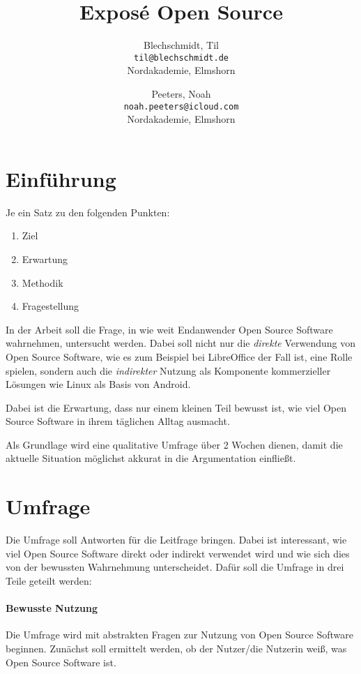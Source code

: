\documentclass[a4paper]{article}
\title{Exposé Open Source}
\author{
  Blechschmidt, Til\\
  \texttt{til@blechschmidt.de}\\
  Nordakademie, Elmshorn
  \and
  Peeters, Noah\\
  \texttt{noah.peeters@icloud.com}\\
  Nordakademie, Elmshorn
}
\begin{document}
	\maketitle
	
	\section{Einführung}
	   Je ein Satz zu den folgenden Punkten:
	   \begin{enumerate}
	       \item Ziel
	       \item Erwartung
	       \item Methodik
	       \item Fragestellung
	   \end{enumerate}
	
	   In der Arbeit soll die Frage, in wie weit Endanwender Open Source Software wahrnehmen, untersucht werden. Dabei soll nicht nur die \emph{direkte} Verwendung von Open Source Software, wie es zum Beispiel bei LibreOffice der Fall ist, eine Rolle spielen, sondern auch die \emph{indirekter} Nutzung als Komponente kommerzieller Lösungen wie Linux als Basis von Android.
	   
	   Dabei ist die Erwartung, dass nur einem kleinen Teil bewusst ist, wie viel Open Source Software in ihrem täglichen Alltag ausmacht.
	   
	   Als Grundlage wird eine qualitative Umfrage über 2 Wochen dienen, damit die aktuelle Situation möglichst akkurat in die Argumentation einfließt.
	
	\section{Umfrage}
	   Die Umfrage soll Antworten für die Leitfrage bringen. Dabei ist interessant, wie viel Open Source Software direkt oder indirekt verwendet wird und wie sich dies von der bewussten Wahrnehmung unterscheidet. Dafür soll die Umfrage in drei Teile geteilt werden:
	   
	   \paragraph{Bewusste Nutzung}
	       Die Umfrage wird mit abstrakten Fragen zur Nutzung von Open Source Software beginnen. Zunächst soll ermittelt werden, ob der Nutzer/die Nutzerin weiß, was Open Source Software ist.
	       
\end{document}
